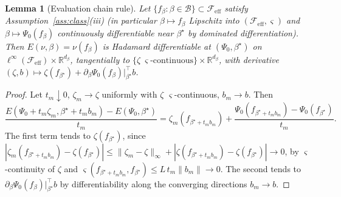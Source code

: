 \documentclass[11pt]{article}
\newtheorem{lemma}{Lemma}
\newcommand{\R}{\mathbb R}
\newcommand{\calB}{\mathcal B}
\newcommand{\calF}{\mathcal F}
\newcommand{\norm}[1]{\lVert #1\rVert}
\begin{document}
\begin{lemma}[Evaluation chain rule]\label{lem:chain}
Let $\{f_\beta:\beta\in\calB\}\subset\calF_{\mathrm{eff}}$ satisfy Assumption~\ref{ass:class}\textup{(iii)} (in particular $\beta\mapsto f_\beta$ Lipschitz into $(\calF_{\mathrm{eff}},\varsigma)$ and $\beta\mapsto\Psi_0(f_\beta)$ continuously differentiable near $\beta^\star$ by dominated differentiation). Then $E(\nu,\beta)=\nu(f_\beta)$ is Hadamard differentiable at $(\Psi_0,\beta^\star)$ on $\ell^\infty(\calF_{\mathrm{eff}})\times\R^{d_\beta}$, tangentially to $\{\zeta\ \varsigma\text{-continuous}\}\times\R^{d_\beta}$, with derivative $(\zeta,b)\mapsto\zeta(f_{\beta^\star})+\partial_\beta\Psi_0(f_\beta)\big|_{\beta^\star}^\top b$.
\end{lemma}

\begin{proof}
Let $t_m\downarrow0$, $\zeta_m\to\zeta$ uniformly with $\zeta$ $\varsigma$-continuous, $b_m\to b$. Then
\begin{equation*}
\frac{E(\Psi_0+t_m\zeta_m,\beta^\star+t_mb_m)-E(\Psi_0,\beta^\star)}{t_m}
=\zeta_m(f_{\beta^\star+t_mb_m})+\frac{\Psi_0(f_{\beta^\star+t_mb_m})-\Psi_0(f_{\beta^\star})}{t_m}.
\end{equation*}
The first term tends to $\zeta(f_{\beta^\star})$, since $|\zeta_m(f_{\beta^\star+t_mb_m})-\zeta(f_{\beta^\star})|\le\norm{\zeta_m-\zeta}_\infty+|\zeta(f_{\beta^\star+t_mb_m})-\zeta(f_{\beta^\star})|\to0$, by $\varsigma$-continuity of $\zeta$ and $\varsigma(f_{\beta^\star+t_mb_m},f_{\beta^\star})\le L\,t_m\norm{b_m}\to0$. The second tends to $\partial_\beta\Psi_0(f_\beta)|_{\beta^\star}^\top b$ by differentiability along the converging directions $b_m\to b$.
\end{proof}
\end{document}
